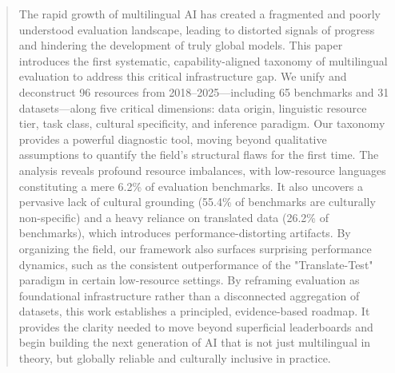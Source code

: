 \documentclass[acmsmall]{acmart}
\begin{document}
\begin{abstract}

The rapid growth of multilingual AI has created a fragmented and poorly understood evaluation landscape, leading to distorted signals of progress and hindering the development of truly global models. This paper introduces the first systematic, capability-aligned taxonomy of multilingual evaluation to address this critical infrastructure gap. We unify and deconstruct 96 resources from 2018–2025—including 65 benchmarks and 31 datasets—along five critical dimensions: data origin, linguistic resource tier, task class, cultural specificity, and inference paradigm. Our taxonomy provides a powerful diagnostic tool, moving beyond qualitative assumptions to quantify the field's structural flaws for the first time. The analysis reveals profound resource imbalances, with low-resource languages constituting a mere 6.2\% of evaluation benchmarks. It also uncovers a pervasive lack of cultural grounding (55.4\% of benchmarks are culturally non-specific) and a heavy reliance on translated data (26.2\% of benchmarks), which introduces performance-distorting artifacts. By organizing the field, our framework also surfaces surprising performance dynamics, such as the consistent outperformance of the "Translate-Test" paradigm in certain low-resource settings. By reframing evaluation as foundational infrastructure rather than a disconnected aggregation of datasets, this work establishes a principled, evidence-based roadmap. It provides the clarity needed to move beyond superficial leaderboards and begin building the next generation of AI that is not just multilingual in theory, but globally reliable and culturally inclusive in practice.



\end{abstract}

\end{document}
